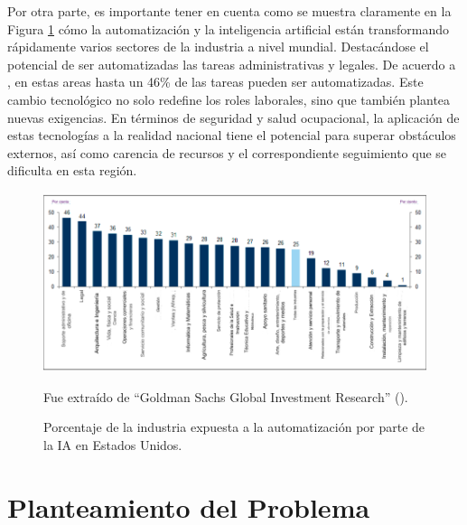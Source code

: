 Por otra parte, es importante tener en cuenta como se muestra claramente en la Figura \ref{figs:share_of_industry_exposed_to_automation_ai_gs} cómo la automatización y la inteligencia artificial están transformando rápidamente varios sectores de la industria a nivel mundial. Destacándose el potencial de ser automatizadas las tareas administrativas y legales. De acuerdo a \textcite{hatzius2023potentially}, en estas areas hasta un 46\% de las tareas pueden ser automatizadas. Este cambio tecnológico no solo redefine los roles laborales, sino que también plantea nuevas exigencias. En términos de seguridad y salud ocupacional, la aplicación de estas tecnologías a la realidad nacional tiene el potencial para superar obstáculos externos, así como carencia de recursos y el correspondiente seguimiento que se dificulta en esta región. 

\begin{figure}[htb]
	\centering
	\includegraphics[width=\textwidth]{images/marcoref/share_of_industry_exposed_to_automation_ai.png}
	\caption{Porcentaje de la industria expuesta a la automatización por parte de la IA en Estados Unidos.} \vspace{-0.2cm}
	\footnotesize{{Fue extraído de ``Goldman Sachs Global Investment Research'' (\citeyear{hatzius2023potentially}).}}
	\label{figs:share_of_industry_exposed_to_automation_ai_gs} 
\end{figure}

\section{Planteamiento del Problema}

